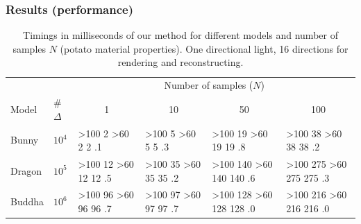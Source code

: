 \documentclass{beamer}
\newcommand\mycolor[1]{
\ifnum#1>100 \cellcolor{redcell}#1%
\else
\ifnum#1>60 \cellcolor{yellowcell}#1%
\else
\cellcolor{greencell}#1%
\fi
\fi
}%
\begin{document}
\begin{frame}
    \frametitle{Results (performance)}
\renewcommand{\arraystretch}{1.8}
\begin{table}[!ht]
\centering
\begin{tabular}{p{3cm}l|l|l|l|l|}
\cline{3-6}
                             &      & \multicolumn{4}{c|}{Number of samples ($N$)}                                          \\ \cline{3-6} 
Model                        & \#$\Delta$& \multicolumn{1}{c|}{1} & \multicolumn{1}{c|}{10} & \multicolumn{1}{c|}{50} & \multicolumn{1}{c|}{100} \\ \hline
\multicolumn{1}{|l|}{Bunny}  & $10^4$ & \mycolor{2}.1                  & \mycolor{5}.3                 & \mycolor{19}.8                  & \mycolor{38}.2                 \\ \hline
\multicolumn{1}{|l|}{Dragon} & $10^5$ & \mycolor{12}.5                 & \mycolor{35}.2                  & \mycolor{140}.6                & \mycolor{275}.3                \\ \hline
\multicolumn{1}{|l|}{Buddha} & $10^6$ & \mycolor{96}.7                 & \mycolor{97}.7                  & \mycolor{128}.0                & \mycolor{216}.0                 \\ \hline
\end{tabular}
\caption{Timings in milliseconds of our method for different models and number of samples $N$ (potato material properties). One directional light, 16 directions for rendering and reconstructing.}
\end{table}
\end{frame}
\end{document}
